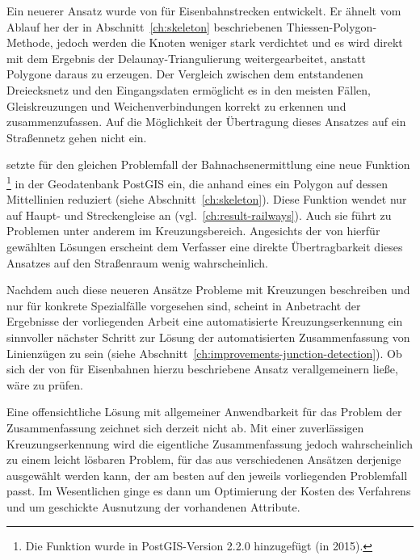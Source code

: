 \documentclass[../main/thesis.tex]{subfiles}
\begin{document}
Ein neuerer Ansatz wurde von \citeauthor{CTGV14} für Eisenbahnstrecken entwickelt.
Er ähnelt vom Ablauf her der in Abschnitt~\ref{ch:skeleton} beschriebenen Thiessen-Polygon-Methode, jedoch werden die Knoten weniger stark verdichtet und es wird direkt mit dem Ergebnis der Delaunay-Triangulierung weitergearbeitet, anstatt Polygone daraus zu erzeugen.
Der Vergleich zwischen dem entstandenen Dreiecksnetz und den Eingangsdaten ermöglicht es in den meisten Fällen, Gleiskreuzungen und Weichenverbindungen korrekt zu erkennen und zusammenzufassen.
Auf die Möglichkeit der Übertragung dieses Ansatzes auf ein Straßennetz gehen \citeauthor{CTGV14} nicht ein. 

 setzte für den gleichen Problemfall der Bahnachsenermittlung eine neue Funktion%
\footnote{Die Funktion  wurde in PostGIS-Version 2.2.0 hinzugefügt (in 2015).}
in der Geodatenbank PostGIS ein, die anhand eines  ein Polygon auf dessen Mittellinien reduziert (siehe Abschnitt~\ref{ch:skeleton}).
Diese Funktion wendet \citeauthor{Mat17} nur auf Haupt- und Streckengleise an (vgl.~\ref{ch:result-railways}).
Auch sie führt zu Problemen unter anderem im Kreuzungsbereich.
Angesichts der von \citeauthor{Mat17} hierfür gewählten Lösungen erscheint dem Verfasser eine direkte Übertragbarkeit dieses Ansatzes auf den Straßenraum wenig wahrscheinlich. 

Nachdem auch diese neueren Ansätze Probleme mit Kreuzungen beschreiben und nur für konkrete Spezialfälle vorgesehen sind, scheint in Anbetracht der Ergebnisse der vorliegenden Arbeit eine automatisierte Kreuzungserkennung
ein sinnvoller nächster Schritt zur Lösung der automatisierten Zusammenfassung von Linienzügen zu sein (siehe Abschnitt~\ref{ch:improvements-junction-detection}).
Ob sich der von \citeauthor{CTGV14} für Eisenbahnen hierzu beschriebene Ansatz verallgemeinern ließe, wäre zu prüfen.

Eine offensichtliche Lösung mit allgemeiner Anwendbarkeit für das Problem der Zusammenfassung zeichnet sich derzeit nicht ab.
Mit einer zuverlässigen Kreuzungserkennung wird die eigentliche Zusammenfassung jedoch wahrscheinlich zu einem leicht lösbaren Problem, für das aus verschiedenen Ansätzen derjenige ausgewählt werden kann, der am besten auf den jeweils vorliegenden Problemfall passt.
Im Wesentlichen ginge es dann um Optimierung der Kosten des Verfahrens und um geschickte Ausnutzung der vorhandenen Attribute. 



\end{document}
